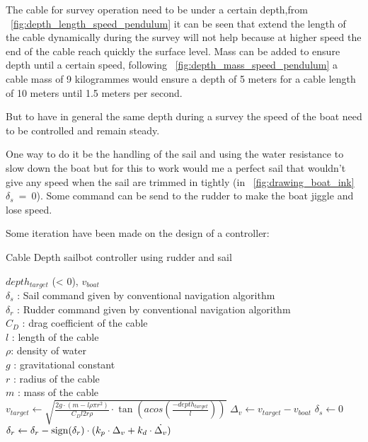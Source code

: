  The cable for survey operation need to be under a certain depth,from ~\ref{fig:depth_length_speed_pendulum} it can be seen that extend the length of the cable dynamically during the survey will not help because at higher speed the end of the cable reach quickly the surface level. Mass can be added to ensure depth until a certain speed, following ~\ref{fig:depth_mass_speed_pendulum} a cable mass of 9 kilogrammes would ensure a depth of 5 meters for a cable length of 10 meters until 1.5 meters per second.

But to have in general the same depth during a survey the speed of the boat need to be controlled and remain steady. 

One  way to do it be the handling of the sail and using the water resistance to slow down the boat but for this to work would me a perfect sail that wouldn't give any speed when the sail are trimmed in tightly (in ~\ref{fig:drawing_boat_ink} $\delta_s~=~0$).
   Some command can be send to the rudder to make the boat jiggle and lose speed.
 
Some iteration have been made on the design of a controller: 
 
\begin{algorithm}[H]
\caption{Cable Depth sailbot controller using rudder and sail }
\label{alg:breakAlg1}
\begin{algorithmic}[1]
\REQUIRE $depth_{target}$ (< 0), $v_{boat}$\\
   $\delta_s$ : Sail command given by conventional navigation algorithm\\
   $\delta_r$ : Rudder command given by conventional navigation algorithm\\
   $C_D$ : drag coefficient of the cable \\
   $l$ : length of the cable\\
   $\rho$: density of water\\
   $g$ : gravitational constant\\
   $r$ : radius of the cable\\
   $m$ : mass of the cable\\
\STATE $v_{target} \leftarrow \sqrt{\frac{2 g \cdot (m - l \rho \pi r^2)}{C_D l 2 r \rho} \cdot \tan(acos(\frac{-depth_{target}}{l}))}$
\STATE $\Delta_{v} \leftarrow v_{target} - v_{boat}$
\STATE $\delta_s \leftarrow 0$
\STATE $\delta_r \leftarrow \delta_r - \textnormal{sign}(\delta_r) \cdot (k_p  \cdot \Delta_v + k_d \cdot \dot{\Delta_v})$
\ENDIF
\end{algorithmic}
\end{algorithm}
 
